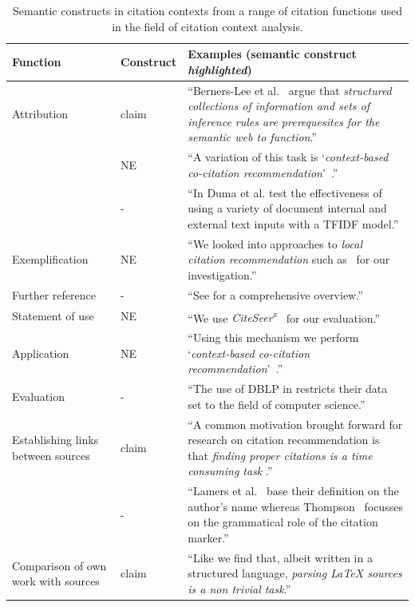 \begin{table}[]
\centering
    \caption{Semantic constructs in citation contexts from a range of citation functions used in the field of citation context analysis.}
    \label{tab:citfunctions}
\begin{center}
    \begin{tabular}{m{2.7cm}lm{8.5cm}}
    \toprule
    Function & Construct & Examples (semantic construct \emph{highlighted})\\
    \midrule
    Attribution & claim & ``Berners-Lee et al.~\cite{Berners-Lee2001} argue that \emph{structured collections of information and sets of inference rules are prerequesites for the semantic web to function}.'' \\\noalign{\smallskip}
    \  & NE & ``A variation of this task is `\emph{context-based co-citation recommendation}'~\cite{Kobayashi2018}.'' \\\noalign{\smallskip}
    \  & - & ``In \cite{Duma2014} Duma et al. test the effectiveness of using a variety of document internal and external text inputs with a TFIDF model.'' \\\noalign{\medskip}
    Exemplification & NE & ``We looked into approaches to \emph{local citation recommendation} such as~\cite{He2010,Huang2014,Huang2015,Duma2014,Duma2016,Ebesu2017,Kobayashi2018,Jeong2019} for our investigation.'' \\\noalign{\medskip}
    Further reference & - & ``See \cite{Niklaus2018} for a comprehensive overview.'' \\\noalign{\medskip}
    Statement of use & NE & ``We use \emph{CiteSeer\textsuperscript{x}}~\cite{Caragea2014} for our evaluation.'' \\\noalign{\medskip}
    Application & NE & ``Using this mechanism we perform `\emph{context-based co-citation recommendation}'~\cite{Kobayashi2018}.'' \\\noalign{\medskip}
    Evaluation & - & ``The use of DBLP in \cite{Faerber2018} restricts their data set to the field of computer science.'' \\\noalign{\medskip}
    Establishing links between sources& claim & ``A common motivation brought forward for research on citation recommendation is that \emph{finding proper citations is a time consuming task} \cite{He2010,He2011,Ebesu2017,Kobayashi2018}.'' \\\noalign{\smallskip}
    \  & - & ``Lamers et al.~\cite{Lamers2018} base their definition on the author's name whereas Thompson~\cite{Thompson2001} focusses on the grammatical role of the citation marker.'' \\\noalign{\medskip}
    Comparison of own work with sources& claim & ``Like \cite{Faerber2018} we find that, albeit written in a structured language, \emph{parsing \LaTeX{} sources is a non trivial task}.'' \\
    \bottomrule
    \end{tabular}
\end{center}
\end{table}

